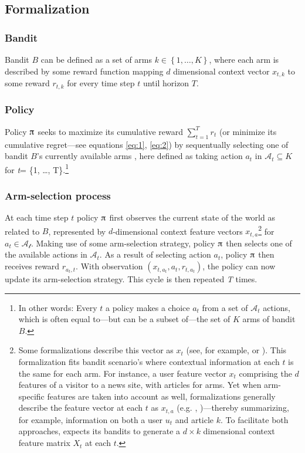 \documentclass{jss}
\begin{document}
\subsection{Formalization} \label{formalization}

\subsubsection{Bandit} \label{formalization}

Bandit $B$ can be defined as a set of arms \(k \in \left\{ 1, \dots, K \right\}\), where each arm is described by some reward function mapping $d$ dimensional context vector $x_{t,k}$ to some reward $r_{t,k}$ \citep{Auer2002,Langford2008} for every time step $t$ until horizon $T$.

\subsubsection{Policy} \label{formalization}

Policy $\piup$ seeks to maximize its cumulative reward $\sum_{t=1}^T r_t$ (or minimize its cumulative regret---see equations \ref{eq:1}, \ref{eq:2}) by sequentually selecting one of bandit $B$'s currently available arms \citep{Bubeck2012}, here defined as taking action $a_t$ in $\mathcal{A}_t \subseteq K$ for \emph{t}= \{1, \ldots, T\}.\footnote{In other words: Every $t$ a policy makes a choice $a_t$ from a set of $\mathcal{A}_t$ actions, which is often equal to---but can be a subset of---the set of $K$ arms of bandit $B$.}

\subsubsection{Arm-selection process} \label{formalization}

At each time step $t$ policy $\piup$ first observes the current state of the world as related to $B$, represented by $d$-dimensional context feature vectors \(x_{t,a}\)\footnote{Some formalizations describe this vector as $x_t$ (see, for example, \cite{Slivkins2014} or \cite{May2012}). This formalization fits bandit scenario's where contextual information at each $t$ is the same for each arm. For instance, a user feature vector $x_t$ comprising the $d$ features of a visitor to a news site, with articles for arms. Yet when arm-specific features are taken into account as well, formalizations generally describe the feature vector at each $t$ as $x_{t,a}$ (e.g. \cite{Chu2009}, \cite{Li2010})---thereby summarizing, for example, information on both a user $u_t$ and article $k$. To facilitate both approaches,  expects its bandits to generate a $d \times k$ dimensional context feature matrix $X_t$ at each $t$.} for \(a_{t} \in \mathcal{A_t}\). Making use of some arm-selection strategy, policy $\piup$ then selects one of the available actions in $\mathcal{A}_t$. As a result of selecting action $a_t$, policy $\piup$ then receives reward \(r_{a_{t},t}\). With observation \( (x_{t,a_t},a_{t},r_{t,a_t}) \), the policy can now update its arm-selection strategy. This cycle is then repeated \textit{T} times.
\end{document}

